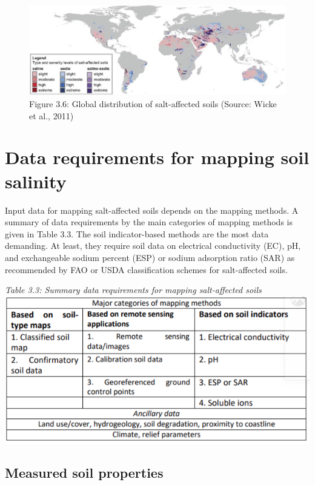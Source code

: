 \documentclass[
  10pt,
  b5paper,
]{book}
\begin{document}
\begin{figure}
\centering
\includegraphics{figures/images/Figure3.6.jpg}
\caption{Figure 3.6: Global distribution of salt-affected soils (Source: Wicke et al., 2011)}
\end{figure}

\hypertarget{data-requirements-for-mapping-soil-salinity}{%
\section{Data requirements for mapping soil salinity}\label{data-requirements-for-mapping-soil-salinity}}

Input data for mapping salt-affected soils depends on the mapping methods. A summary of data requirements by the main categories of mapping methods is given in Table 3.3. The soil indicator-based methods are the most data demanding. At least, they require soil data on electrical conductivity (EC), pH, and exchangeable sodium percent (ESP) or sodium adsorption ratio (SAR) as recommended by FAO or USDA classification schemes for salt-affected soils.

\emph{Table 3.3: Summary data requirements for mapping salt-affected soils}
\includegraphics{figures/tables/Table_3.3.PNG}

\hypertarget{measured-soil-properties}{%
\subsection{Measured soil properties}\label{measured-soil-properties}}
\end{document}
